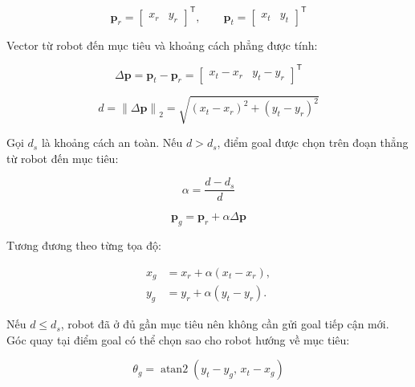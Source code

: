 \begin{equation}
    \mathbf{p}_r
    =
    \begin{bmatrix}
        x_r & y_r
    \end{bmatrix}^{\mathsf{T}},
    \qquad
    \mathbf{p}_t
    =
    \begin{bmatrix}
        x_t & y_t
    \end{bmatrix}^{\mathsf{T}}
    \label{eq:mission-robot-target-positions}
\end{equation}

Vector từ robot đến mục tiêu và khoảng cách phẳng được tính:

\begin{equation}
    \Delta\mathbf{p}
    =
    \mathbf{p}_t-\mathbf{p}_r
    =
    \begin{bmatrix}
        x_t-x_r & y_t-y_r
    \end{bmatrix}^{\mathsf{T}}
    \label{eq:mission-delta-p}
\end{equation}

\begin{equation}
    d
    =
    \left\lVert\Delta\mathbf{p}\right\rVert_2
    =
    \sqrt{(x_t-x_r)^2+(y_t-y_r)^2}
    \label{eq:mission-target-distance}
\end{equation}

Gọi $d_s$ là khoảng cách an toàn. Nếu $d>d_s$, điểm goal được chọn trên đoạn thẳng từ robot đến mục tiêu:

\begin{equation}
    \alpha
    =
    \frac{d-d_s}{d}
    \label{eq:mission-alpha}
\end{equation}

\begin{equation}
    \mathbf{p}_g
    =
    \mathbf{p}_r+\alpha\Delta\mathbf{p}
    \label{eq:mission-safe-goal-vector}
\end{equation}

Tương đương theo từng tọa độ:

\begin{align}
    x_g &= x_r+\alpha(x_t-x_r), \label{eq:mission-safe-goal-x}\\
    y_g &= y_r+\alpha(y_t-y_r). \label{eq:mission-safe-goal-y}
\end{align}

Nếu $d\leq d_s$, robot đã ở đủ gần mục tiêu nên không cần gửi goal tiếp cận mới. Góc quay tại điểm goal có thể chọn sao cho robot hướng về mục tiêu:

\begin{equation}
    \theta_g
    =
    \operatorname{atan2}(y_t-y_g,\,x_t-x_g)
    \label{eq:mission-safe-goal-heading}
\end{equation}

